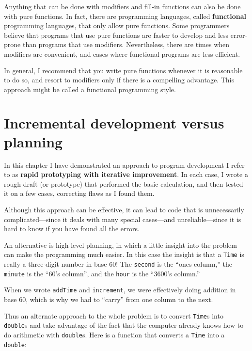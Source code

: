 Anything that can be done with modifiers and fill-in functions can also
be done with pure functions.  In fact, there are programming
languages, called {\bf functional} programming languages, that only
allow pure functions.  Some programmers believe that programs that use
pure functions are faster to develop and less error-prone than
programs that use modifiers.  Nevertheless, there are times when
modifiers are convenient, and cases where functional programs
are less efficient.

In general, I recommend that you write pure functions whenever
it is reasonable to do so, and resort to modifiers only if there
is a compelling advantage.  This approach might be called a
functional programming style.

\section{Incremental development versus planning}

In this chapter I have demonstrated an approach to program
development I refer to as {\bf rapid prototyping with iterative
improvement}.  In each case, I wrote a rough draft (or prototype)
that performed the basic calculation, and then tested it on
a few cases, correcting flaws as I found them.

Although this approach can be effective, it can lead to code
that is unnecessarily complicated---since it deals with many
special cases---and unreliable---since it is hard to know if
you have found all the errors.

An alternative is high-level planning, in which a little insight
into the problem can make the programming much easier.  In
this case the insight is that a {\tt Time} is really a three-digit
number in base 60!  The {\tt second} is the ``ones column,''
the {\tt minute} is the ``60's column'', and the {\tt hour}
is the ``3600's column.''

When we wrote {\tt addTime} and {\tt increment}, we were effectively
doing addition in base 60, which is why we had to ``carry'' from one
column to the next.


Thus an alternate approach to the whole problem is to convert
{\tt Time}s into {\tt double}s and take advantage of the fact that
the computer already knows how to do arithmetic with {\tt double}s.
Here is a function that converts a {\tt Time} into a {\tt double}:

